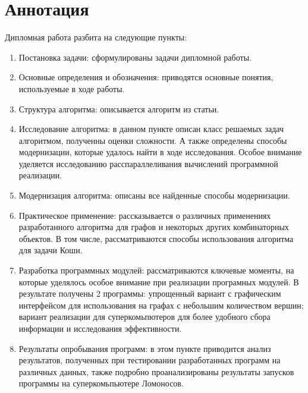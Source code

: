 \section*{Аннотация}
\label{sec:Annotation} 
\large

Дипломная работа разбита на следующие пункты:
\begin{enumerate}
\item Постановка задачи: сформулированы задачи дипломной работы.
\item Основные определения и обозначения: приводятся основные понятия, используемые в ходе работы.
\item Структура алгоритма: описывается алгоритм из статьи.
\item Исследование алгоритма: в данном пункте описан класс решаемых задач алгоритмом, полученны оценки сложности. А также определены способы модернизации, которые удалось найти в ходе исследования. Особое внимание уделяется исследованию расспараллеливания вычислений программной реализации.
\item Модернизация алгоритма: описаны все найденные способы модернизации.
\item Практическое применение: рассказывается о различных применениях разработанного алгоритма для графов и некоторых других комбинаторных объектов. В том числе, рассматриваются способы использования алгоритма для задачи Коши.
\item Разработка программных модулей: рассматриваются ключевые моменты, на которые уделялось особое внимание при реализации програмных модулей. В результате получены 2 программы: упрощенный вариант с графическим интерфейсом для использования на графах с небольшим количеством вершин; вариант реализации для суперкомьпютеров для более удобного сбора информации и исследования эффективности.
\item Результаты опробывания программ: в этом пункте приводится анализ результатов, полученных при тестировании разработанных программ на различных данных, также подробно проанализированы результаты запусков программы на суперкомьпьютере Ломоносов.
\end{enumerate}